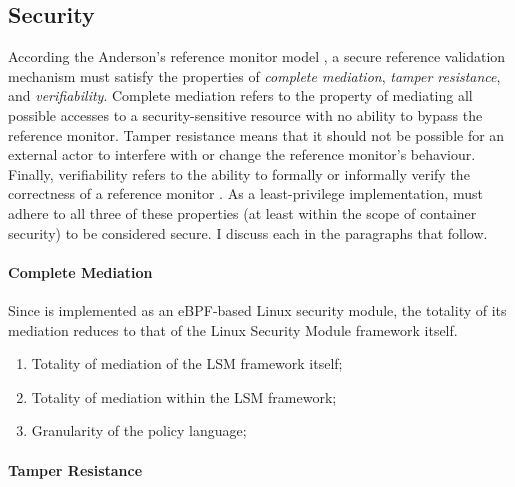 \subsection{Security}

According the Anderson's reference monitor model \cite{anderson1973_planning_study}, a secure reference validation mechanism must satisfy the properties of \textit{complete mediation}, \textit{tamper resistance}, and \textit{verifiability}. Complete mediation refers to the property of mediating all possible accesses to a security-sensitive resource with no ability to bypass the reference monitor. Tamper resistance means that it should not be possible for an external actor to interfere with or change the reference monitor's behaviour. Finally, verifiability refers to the ability to formally or informally verify the correctness of a reference monitor \cite{jaeger2011_reference_monitor}. As a least-privilege implementation, \bpfcontain{} must adhere to all three of these properties (at least within the scope of container security) to be considered secure. I discuss each in the paragraphs that follow.


\paragraph*{Complete Mediation}

Since \bpfcontain{} is implemented as an eBPF-based Linux security module, the totality of its mediation reduces to that of the Linux Security Module framework itself. 

\begin{enumerate}
  \item Totality of mediation of the LSM framework itself;
  \item Totality of mediation within the LSM framework;
  \item Granularity of the policy language;
\end{enumerate}

\paragraph*{Tamper Resistance}

